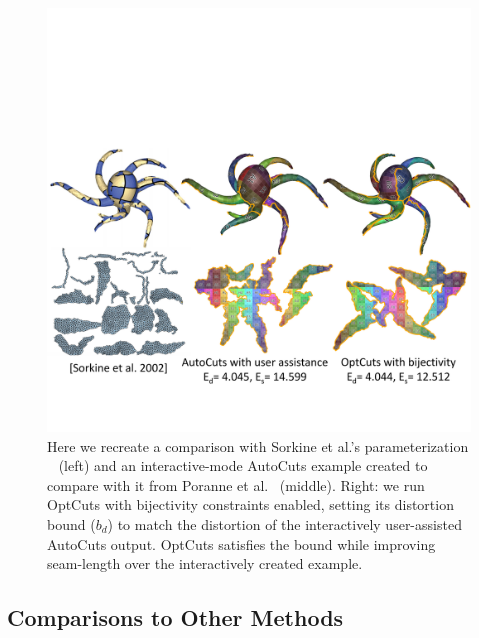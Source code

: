 \begin{figure}[t]
\centering
\includegraphics[width=\linewidth]{fig/comp_AutoCuts_Olga.pdf}
\vspace{-0.5cm}
\caption{Here we recreate a comparison with Sorkine et al.'s parameterization \  (left) and an interactive-mode AutoCuts example created to compare with it from Poranne et al.\  (middle). 
Right: we run OptCuts with bijectivity constraints enabled, setting its distortion bound ($b_d$) to match the distortion of the interactively user-assisted AutoCuts output. OptCuts satisfies the bound while improving seam-length over the interactively created example.}
\vspace{-0.5cm}
\label{fig:comp_AutoCuts_Olga}
\end{figure}

\subsection{Comparisons to Other Methods}
\label{sec:cmpr_other}

